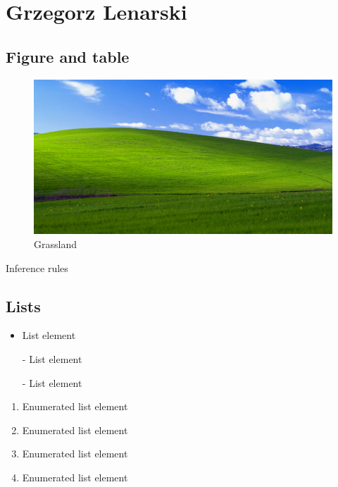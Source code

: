 \section{Grzegorz Lenarski}

\subsection{Figure and table}
\begin{figure}[h]
    \centering
    \includegraphics[width=\textwidth]{pictures/xp.png}
    \caption{Grassland}
    \label{fig:xp}
\end{figure}

\begin{table}[h]
    \centering
    
    \caption{Inference rules}
    \label{tab:Inference-rules}
\end{table}

\subsection{Lists}

\begin{itemize}
 \item List element
 \item[-] List element
 \item[-] List element
\end{itemize}

\vspace{0.5cm}

\begin{enumerate}
 \item Enumerated list element
 \item Enumerated list element
 \item Enumerated list element
 \item Enumerated list element
\end{enumerate}

